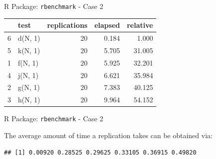 \begin{frame}[fragile]{R Package: \texttt{rbenchmark} - Case 2}

\begin{Shaded}
\begin{Highlighting}[]
\StringTok{ } 
\StringTok{ }\NormalTok{(}\NormalTok{), }\NormalTok{), }\NormalTok{), }\NormalTok{), }\NormalTok{), }\NormalTok{), }
           \NormalTok{(}\NormalTok{, }\NormalTok{, }\NormalTok{, }\NormalTok{), }
          \NormalTok{,  }
          \NormalTok{)   }
\end{Highlighting}
\end{Shaded}

\begin{longtable}[c]{@{}llrrr@{}}
\toprule
& test & replications & elapsed & relative\tabularnewline
\midrule
\endhead
6 & d(N, 1) & 20 & 0.184 & 1.000\tabularnewline
5 & k(N, 1) & 20 & 5.705 & 31.005\tabularnewline
1 & f(N, 1) & 20 & 5.925 & 32.201\tabularnewline
4 & j(N, 1) & 20 & 6.621 & 35.984\tabularnewline
2 & g(N, 1) & 20 & 7.383 & 40.125\tabularnewline
3 & h(N, 1) & 20 & 9.964 & 54.152\tabularnewline
\bottomrule
\end{longtable}

\end{frame}

\begin{frame}[fragile]{R Package: \texttt{rbenchmark} - Case 2}

The average amount of time a replication takes can be obtained via:

\begin{Shaded}
\begin{Highlighting}[]
\NormalTok{out[,}\NormalTok{] /}\StringTok{ }\NormalTok{out[,}\NormalTok{]}
\end{Highlighting}
\end{Shaded}

\begin{verbatim}
## [1] 0.00920 0.28525 0.29625 0.33105 0.36915 0.49820
\end{verbatim}

\end{frame}

